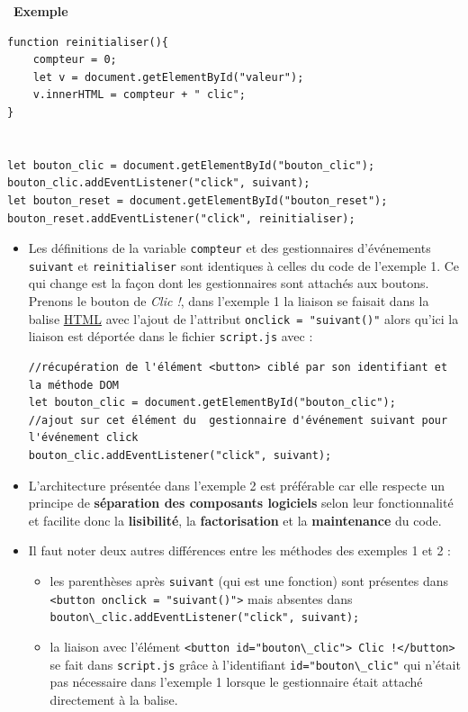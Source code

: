 \documentclass[
  11pt,
]{article}
\newcommand{\passthrough}[1]{#1}
\providecommand{\tightlist}{%
  \setlength{\itemsep}{0pt}\setlength{\parskip}{0pt}}
\newcounter{exple}
\newenvironment{exemple}[1]
{\par \medskip   \addtocounter{exple}{1} \noindent  
\begin{bclogo}[arrondi =0.1,   noborder = true, logo=\bclampe, marge=4]{~\textbf{Exemple} \textbf{\theexple} {\itshape #1} }  \par}
{
\end{bclogo}
 \par \bigskip }
\newcounter{logi}
\begin{document}
\begin{exemple}{}
\begin{lstlisting}
function reinitialiser(){
    compteur = 0;
    let v = document.getElementById("valeur");
    v.innerHTML = compteur + " clic";
}


let bouton_clic = document.getElementById("bouton_clic");
bouton_clic.addEventListener("click", suivant);
let bouton_reset = document.getElementById("bouton_reset");
bouton_reset.addEventListener("click", reinitialiser);
\end{lstlisting}

\begin{itemize}
\item
  Les définitions de la variable \passthrough{\lstinline!compteur!} et
  des gestionnaires d'événements \passthrough{\lstinline!suivant!} et
  \passthrough{\lstinline!reinitialiser!} sont identiques à celles du
  code de l'exemple 1. Ce qui change est la façon dont les gestionnaires
  sont attachés aux boutons. Prenons le bouton de \emph{Clic !}, dans
  l'exemple 1 la liaison se faisait dans la balise
  \href{https://developer.mozilla.org/fr/docs/Glossaire/HTML}{HTML} avec
  l'ajout de l'attribut \passthrough{\lstinline!onclick = "suivant()"!}
  alors qu'ici la liaison est déportée dans le fichier
  \passthrough{\lstinline!script.js!} avec :

\begin{lstlisting}
//récupération de l'élément <button> ciblé par son identifiant et la méthode DOM
let bouton_clic = document.getElementById("bouton_clic");
//ajout sur cet élément du  gestionnaire d'événement suivant pour l'événement click
bouton_clic.addEventListener("click", suivant);
\end{lstlisting}
\item
  L'architecture présentée dans l'exemple 2 est préférable car elle
  respecte un principe de \textbf{séparation des composants logiciels}
  selon leur fonctionnalité et facilite donc la \textbf{lisibilité}, la
  \textbf{factorisation} et la \textbf{maintenance} du code.
\item
  Il faut noter deux autres différences entre les méthodes des exemples
  1 et 2 :

  \begin{itemize}
  \tightlist
  \item
    les parenthèses après \passthrough{\lstinline!suivant!} (qui est une
    fonction) sont présentes dans
    \passthrough{\lstinline!<button onclick = "suivant()">!} mais
    absentes dans
    \passthrough{\lstinline!bouton\_clic.addEventListener("click", suivant);!}
  \item
    la liaison avec l'élément
    \passthrough{\lstinline'<button id="bouton\_clic"> Clic !</button>'}
    se fait dans \passthrough{\lstinline!script.js!} grâce à
    l'identifiant \passthrough{\lstinline!id="bouton\_clic"!} qui
    n'était pas nécessaire dans l'exemple 1 lorsque le gestionnaire
    était attaché directement à la balise.
  \end{itemize}
\end{itemize}

\end{exemple}
\end{document}
